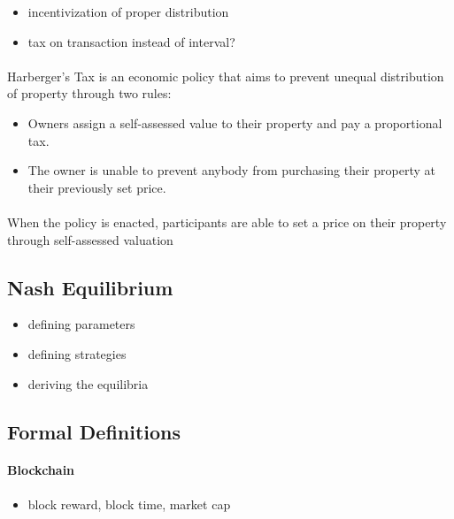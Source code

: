\begin{itemize}
  \item incentivization of proper distribution
  \item tax on transaction instead of interval?
\end{itemize}

\paragraph{} Harberger's Tax is an economic policy that aims to prevent unequal distribution of property through two rules:

\begin{itemize}
  \item Owners assign a self-assessed value to their property and pay a proportional tax.
  \item The owner is unable to prevent anybody from purchasing their property at their previously set price.
\end{itemize}

\paragraph{} When the policy is enacted, participants are able to set a price on their property through self-assessed valuation

\subsection{Nash Equilibrium}

\begin{itemize}
  \item defining parameters
  \item defining strategies
  \item deriving the equilibria
\end{itemize}

\subsection{Formal Definitions}

\paragraph{Blockchain}

\begin{itemize}
  \item block reward, block time, market cap
\end{itemize}

